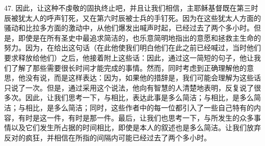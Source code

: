 47. 因此，让这种不虔敬的固执终止吧，并且让我们相信，主耶稣基督既在第三时辰被犹太人的呼声钉死，又在第六时辰被士兵的手钉死。因为在这些犹太人方面的骚动和比拉多方面的激动中，从他们爆发出喊声时起，已经过去了两个多小时。但是，即使是在所有圣史中最追求简洁的，也乐意简明地指出的意愿和拯救主生命的努力。因为，在给出这句话（在此他使我们明白他们在此之前已经喊过，当时他们要求释放给他们）之后，他接着附上这些话：因此，通过这一简短的句子，他让我们了解了那些需要很长时间才能完成的事情。然而，同时考虑到正确理解他的意思，他没有说，而是这样表达：因为，如果他的措辞是，我们可能会理解为这些话只说了一次。但是，通过采用这个说法，他向有智慧的人清楚地表明，反复说了很多次。因此，让我们思考一下，与相比，表达此事是多么简洁；与相比，是多么简洁；与相比，是多么简洁；同时，这些作者中的每一位都引入了一些自己特有的内容，有时是这一件，有时是那一件。最后，让我们也思考一下，与所发生的众多事情以及它们发生所占据的时间相比，即使是本人的叙述也是多么简洁。让我们放弃反对的疯狂，并相信在所指的间隔内可能已经过去了两个多小时。\par

